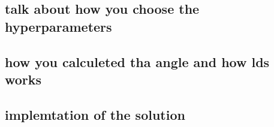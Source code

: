 \documentclass[12pt]{extarticle}
\begin{document}
  \subsection{talk about how you choose the hyperparameters}
  \subsection{how you calculeted tha angle and how lds works}
  

\subsection{implemtation of the solution}











 


\newpage


\end{document}
